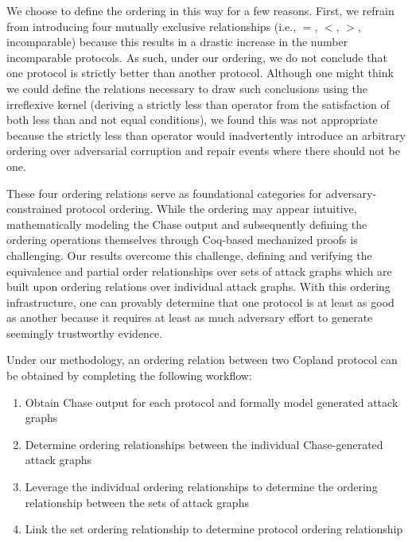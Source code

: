 \documentclass[runningheads]{llncs}
\theoremstyle{definition}
\newcommand{\squash}{\itemsep=0pt\parskip=0pt}
\begin{document}
\noindent We choose to define the ordering in this way for a few reasons. First, we refrain from introducing four mutually exclusive relationships (i.e., $=$, $<$, $>$, incomparable) because this results in a drastic increase in the number incomparable protocols. As such, under our ordering, we do not conclude that one protocol is strictly better than another protocol. Although one might think we could define the relations necessary to draw such conclusions using the irreflexive kernel (deriving a strictly less than operator from the satisfaction of both less than and not equal conditions), we found this was not appropriate because the strictly less than operator would inadvertently introduce an arbitrary ordering over adversarial corruption and repair events where there should not be one.  


These four ordering relations serve as foundational categories for adversary-constrained protocol ordering. While the ordering may appear intuitive, mathematically modeling the Chase output and subsequently defining the ordering operations themselves through Coq-based mechanized proofs is challenging. Our results overcome this challenge, defining and verifying the equivalence and partial order relationships over sets of attack graphs which are built upon ordering relations over individual attack graphs. With this ordering infrastructure, one can provably determine that one protocol is at least as good as another because it requires at least as much adversary effort to generate seemingly trustworthy evidence. 

Under our methodology, an ordering relation between two Copland protocol can be obtained by completing the following workflow:

\begin{enumerate}
    \squash
    \item Obtain Chase output for each protocol and formally model generated attack graphs
    \item Determine ordering relationships between the individual Chase-generated attack graphs
    \item Leverage the individual ordering relationships to determine the ordering relationship between the sets of attack graphs
    \item Link the set ordering relationship to determine protocol ordering relationship
\end{enumerate}

\end{document}
